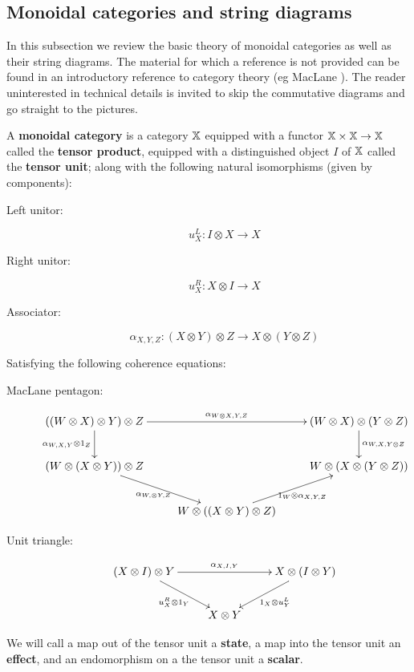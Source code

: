 
\subsection{Monoidal categories and string diagrams}
\label{subsec:moncat}

In this subsection we review the basic theory of monoidal categories as well as their string diagrams.   The material for which a reference is not provided can be found in an introductory reference to category theory (eg MacLane \cite{maclane}).  The reader uninterested in technical details is invited to skip the commutative diagrams and go straight to the pictures.

\begin{definition}
A {\bf monoidal category} is a category $\mathbb{X}$ equipped with a functor $\mathbb{X}\times\mathbb{X}\to \mathbb{X}$ called the {\bf tensor product}, equipped with a distinguished object $I$ of $\mathbb{X}$ called the {\bf tensor unit}; along with the following natural isomorphisms (given by components):

\begin{description}
\item[Left unitor:]
$$
u_X^L:I\otimes X \to X
$$
\item[Right unitor:]
$$
u_X^R: X\otimes I \to X
$$
\item[Associator:]
$$
\alpha_{X,Y,Z}:(X\otimes Y)\otimes Z \to X\otimes(Y\otimes Z)
$$
\end{description}

Satisfying the following coherence equations:

\begin{description}
\item[MacLane pentagon:]


$$
\xymatrix{
  ((W\otimes X )\otimes Y)\otimes Z \ar[rr]^{\alpha_{W\otimes X,Y,Z}} \ar[d]_{\alpha_{W,X,Y}\otimes 1_Z}
    &
    & (W\otimes X )\otimes (Y\otimes Z) \ar[d]^{\alpha_{W, X,Y\otimes Z}}
  \\  (W\otimes(X\otimes Y))\otimes Z \ar[dr]_{\alpha_{W,\otimes Y,Z}}
    & 
    & W\otimes (X\otimes(Y\otimes Z)) 
  \\&
    W\otimes ((X\otimes Y)\otimes Z) \ar[ur]_{1_W\otimes \alpha_{X,Y,Z}}
}
$$

\item[Unit triangle:]

$$
\xymatrix{
  (X\otimes I)\otimes Y \ar[rr]^{\alpha_{X,I,Y}} \ar[dr]_{u_X^{R}\otimes 1_Y}
    &
    & X\otimes (I\otimes Y) \ar[dl]^{1_X\otimes u_Y^{L}}\\
  & X\otimes Y
}
$$

\end{description}


We will call a map out of the tensor unit a {\bf state}, a map into the tensor unit an {\bf effect}, and an endomorphism on a the tensor unit a {\bf scalar}.
\end{definition}


